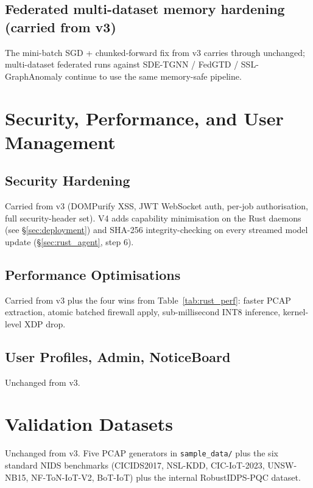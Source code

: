 \documentclass[11pt,a4paper]{article}
\begin{document}
\subsection{Federated multi-dataset memory hardening (carried from v3)}
The mini-batch SGD + chunked-forward fix from v3 carries through
unchanged; multi-dataset federated runs against SDE-TGNN / FedGTD /
SSL-GraphAnomaly continue to use the same memory-safe pipeline.

\section{Security, Performance, and User Management}
\label{sec:security_performance}

\subsection{Security Hardening}
Carried from v3 (DOMPurify XSS, JWT WebSocket auth, per-job
authorisation, full security-header set).  V4 adds capability
minimisation on the Rust daemons (see \S\ref{sec:deployment}) and
SHA-256 integrity-checking on every streamed model update
(\S\ref{sec:rust_agent}, step 6).

\subsection{Performance Optimisations}
Carried from v3 plus the four wins from
Table~\ref{tab:rust_perf}: faster PCAP extraction, atomic batched
firewall apply, sub-millisecond INT8 inference, kernel-level XDP
drop.

\subsection{User Profiles, Admin, NoticeBoard}
Unchanged from v3.

\section{Validation Datasets}
\label{sec:datasets}

Unchanged from v3.  Five PCAP generators in \texttt{sample\_data/}
plus the six standard NIDS benchmarks (CICIDS2017, NSL-KDD,
CIC-IoT-2023, UNSW-NB15, NF-ToN-IoT-V2, BoT-IoT) plus the
internal RobustIDPS-PQC dataset.
\end{document}
